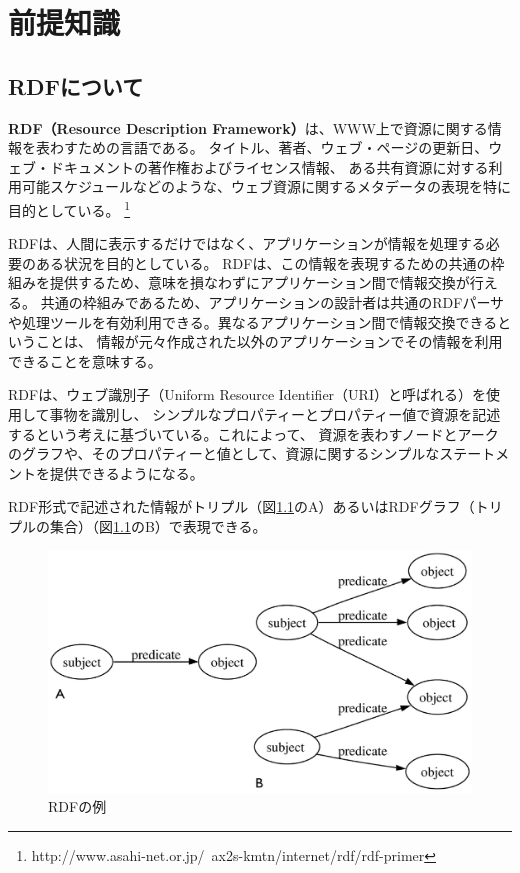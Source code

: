 ﻿%
\chapter{前提知識}

\section{RDFについて}
\label{knowlegde:rdf}

\textbf{RDF（Resource Description Framework）}は、WWW上で資源に関する情報を表わすための言語である。
タイトル、著者、ウェブ・ページの更新日、ウェブ・ドキュメントの著作権およびライセンス情報、
ある共有資源に対する利用可能スケジュールなどのような、ウェブ資源に関するメタデータの表現を特に目的としている。
\footnote{http://www.asahi-net.or.jp/~ax2s-kmtn/internet/rdf/rdf-primer}

RDFは、人間に表示するだけではなく、アプリケーションが情報を処理する必要のある状況を目的としている。
RDFは、この情報を表現するための共通の枠組みを提供するため、意味を損なわずにアプリケーション間で情報交換が行える。
共通の枠組みであるため、アプリケーションの設計者は共通のRDFパーサや処理ツールを有効利用できる。異なるアプリケーション間で情報交換できるということは、
情報が元々作成された以外のアプリケーションでその情報を利用できることを意味する。

RDFは、ウェブ識別子（Uniform Resource Identifier（URI）と呼ばれる）を使用して事物を識別し、
シンプルなプロパティーとプロパティー値で資源を記述するという考えに基づいている。これによって、
資源を表わすノードとアークのグラフや、そのプロパティーと値として、資源に関するシンプルなステートメントを提供できるようになる。

RDF形式で記述された情報がトリプル（図\ref{fig:rdf_triple}のA）あるいはRDFグラフ（トリプルの集合）（図\ref{fig:rdf_triple}のB）で表現できる。

\begin{figure}[h!]
 	\begin{center}
 		\includegraphics[width=160mm]{./images/rdf_sample.eps}
 		\caption{RDFの例}
 		\label{fig:rdf_triple}
 	\end{center}
\end{figure}

